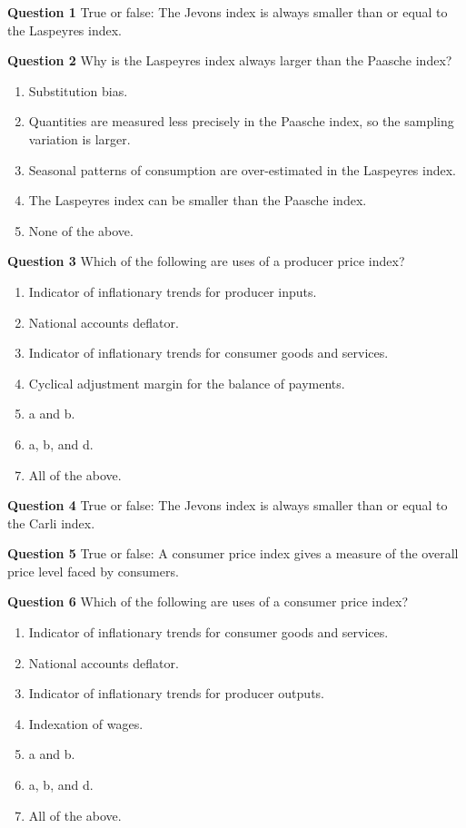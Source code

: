\documentclass[]{article}
\begin{document}
\textbf{Question 1} True or false: The Jevons index is always smaller than or equal to the Laspeyres index.

\textbf{Question 2} Why is the Laspeyres index always larger than the Paasche index?

\begin{enumerate}
\def\labelenumi{\alph{enumi})}
\item
  Substitution bias.
\item
  Quantities are measured less precisely in the Paasche index, so the sampling variation is
  larger.
\item
  Seasonal patterns of consumption are over-estimated in the Laspeyres index.
\item
  The Laspeyres index can be smaller than the Paasche index.
\item
  None of the above.
\end{enumerate}

\textbf{Question 3} Which of the following are uses of a producer price index?

\begin{enumerate}
\def\labelenumi{\alph{enumi})}
\item
  Indicator of inflationary trends for producer inputs.
\item
  National accounts deflator.
\item
  Indicator of inflationary trends for consumer goods and services.
\item
  Cyclical adjustment margin for the balance of payments.
\item
  a and b.
\item
  a, b, and d.
\item
  All of the above.
\end{enumerate}

\textbf{Question 4} True or false: The Jevons index is always smaller than or equal to the Carli index.

\textbf{Question 5} True or false: A consumer price index gives a measure of the overall price level faced by consumers.

\textbf{Question 6} Which of the following are uses of a consumer price index?

\begin{enumerate}
\def\labelenumi{\alph{enumi})}
\item
  Indicator of inflationary trends for consumer goods and services.
\item
  National accounts deflator.
\item
  Indicator of inflationary trends for producer outputs.
\item
  Indexation of wages.
\item
  a and b.
\item
  a, b, and d.
\item
  All of the above.
\end{enumerate}
\end{document}
